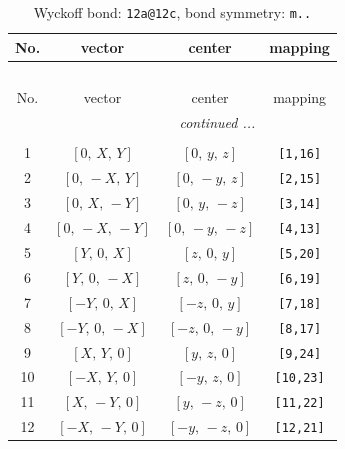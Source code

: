 \documentclass[fleqn,8pt]{jsarticle}
\begin{document}
\begin{longtable}{cccc}
\caption{Wyckoff bond: {\tt 12a@12c}, bond symmetry: {\tt m..}}
 \\
 \hline \hline
No. & vector & center & mapping \\ \hline \endfirsthead

\multicolumn{3}{l}{\tablename\ \thetable{}} \\
 \hline \hline
No. & vector & center & mapping \\ \hline \endhead

 \hline \hline
\multicolumn{3}{r}{\footnotesize\it continued ...} \\ \endfoot

 \hline \hline
\multicolumn{3}{r}{} \\ \endlastfoot

1 & $\left[ 0,\, X,\, Y \right]$ & $\left[ 0,\, y,\, z \right]$ & {\tt [1,16]} \\ \hline
2 & $\left[ 0,\, - X,\, Y \right]$ & $\left[ 0,\, - y,\, z \right]$ & {\tt [2,15]} \\ \hline
3 & $\left[ 0,\, X,\, - Y \right]$ & $\left[ 0,\, y,\, - z \right]$ & {\tt [3,14]} \\ \hline
4 & $\left[ 0,\, - X,\, - Y \right]$ & $\left[ 0,\, - y,\, - z \right]$ & {\tt [4,13]} \\ \hline
5 & $\left[ Y,\, 0,\, X \right]$ & $\left[ z,\, 0,\, y \right]$ & {\tt [5,20]} \\ \hline
6 & $\left[ Y,\, 0,\, - X \right]$ & $\left[ z,\, 0,\, - y \right]$ & {\tt [6,19]} \\ \hline
7 & $\left[ - Y,\, 0,\, X \right]$ & $\left[ - z,\, 0,\, y \right]$ & {\tt [7,18]} \\ \hline
8 & $\left[ - Y,\, 0,\, - X \right]$ & $\left[ - z,\, 0,\, - y \right]$ & {\tt [8,17]} \\ \hline
9 & $\left[ X,\, Y,\, 0 \right]$ & $\left[ y,\, z,\, 0 \right]$ & {\tt [9,24]} \\ \hline
10 & $\left[ - X,\, Y,\, 0 \right]$ & $\left[ - y,\, z,\, 0 \right]$ & {\tt [10,23]} \\ \hline
11 & $\left[ X,\, - Y,\, 0 \right]$ & $\left[ y,\, - z,\, 0 \right]$ & {\tt [11,22]} \\ \hline
12 & $\left[ - X,\, - Y,\, 0 \right]$ & $\left[ - y,\, - z,\, 0 \right]$ & {\tt [12,21]} \\
\end{longtable}
\renewcommand{\arraystretch}{1.2}
\end{document}
